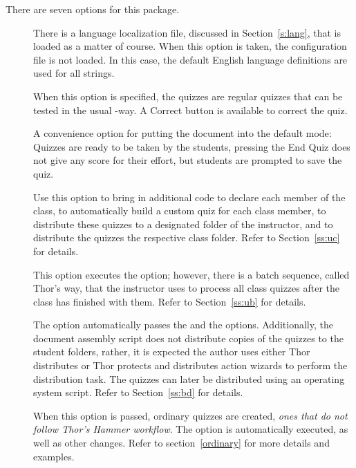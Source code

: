 \documentclass{article}
\begin{document}
There are seven options for this package.
\begin{description}
 \item[] There is a language localization file, discussed in
     Section~\ref{s:lang}, that is loaded as a matter of course. When this
     option is taken, the configuration file is not loaded. In this case,
     the default English language definitions are used for all strings.
 \item[] When this option is specified, the quizzes are
     regular quizzes that can be tested in the usual -way. A
     \textsf{Correct} button is available to correct the quiz.
 \item[] A convenience option for putting the document into
     the default mode: Quizzes are ready to be taken by the students,
     pressing the \textsf{End Quiz} does not give any score for their
     effort, but students are prompted to save the quiz.
 \item[] Use this option to bring in additional code to
     declare each member of the class, to automatically build a custom quiz
     for each class member, to distribute these quizzes to a designated
     folder of the instructor, and to distribute the quizzes the respective
     class folder. Refer to Section~\ref{ss:uc} for details.
  \item[] This option executes the  option;
      however, there is a batch sequence, called \textsf{Thor's way}, that
      the instructor uses to process all class quizzes after the class has
      finished with them. Refer to Section~\ref{ss:ub} for details.
  \item[] The option automatically passes the
       and the  options.
      Additionally, the document assembly script does not
      distribute copies of the quizzes to the student folders,
      rather, it is expected the author uses either
      \textsf{Thor distributes} or \textsf{Thor protects and
      distributes} action wizards to perform the distribution
      task. The quizzes can later be distributed using an
      operating system script. Refer to Section~\ref{ss:bd}
      for details.
 \item[] When this option is passed, ordinary
     quizzes are created, \emph{ones that do not follow Thor's
     Hammer workflow}. The  option is
     automatically executed, as well as other changes. Refer
     to section~\ref{ordinary} for more details and examples.
\end{description}
\end{document}
